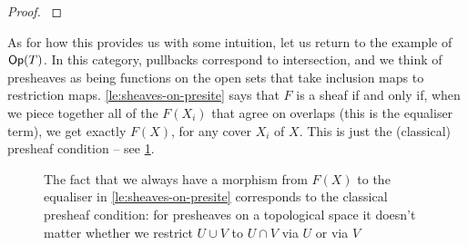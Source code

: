         \begin{proof}
            \cite[\S III.4,~Proposition 1]{MacLane:1992uz}
        \end{proof}

        As for how this provides us with some intuition, let us return to the example of $\mathsf{Op}(T)$.
        In this category, pullbacks correspond to intersection, and we think of presheaves as being functions on the open sets that take inclusion maps to restriction maps.
        \cref{le:sheaves-on-presite} says that $F$ is a sheaf if and only if, when we piece together all of the $F(X_i)$ that agree on overlaps (this is the equaliser term), we get exactly $F(X)$, for any cover ${X_i}$ of $X$.
        This is just the (classical) presheaf condition -- see \cref{fg:sheaves}.

        \begin{figure}[h]
            \centering
            \caption{The fact that we always have a morphism from $F(X)$ to the equaliser in \cref{le:sheaves-on-presite} corresponds to the classical presheaf condition: for presheaves on a topological space it doesn't matter whether we restrict $U\cup V$ to $U\cap V$ via $U$ or via $V$}
            \label{fg:sheaves}
        \end{figure}

